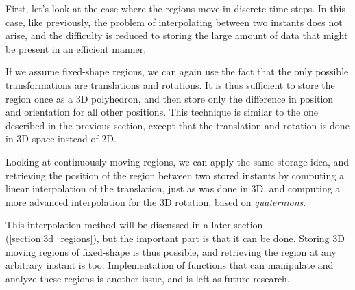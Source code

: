 First, let's look at the case where the regions move in discrete time steps. In this case, like previously, the problem of interpolating between two instants does not arise, and the difficulty is reduced to storing the large amount of data that might be present in an efficient manner. 

If we assume fixed-shape regions, we can again use the fact that the only possible transformations are translations and rotations. It is thus sufficient to store the region once as a 3D polyhedron, and then store only the difference in position and orientation for all other positions. This technique is similar to the one described in the previous section, except that the translation and rotation is done in 3D space instead of 2D.

Looking at continuously moving regions, we can apply the same storage idea, and retrieving the position of the region between two stored instants by computing a linear interpolation of the translation, just as was done in 3D, and computing a more advanced interpolation for the 3D rotation, based on \textit{quaternions}.

This interpolation method will be discussed in a later section (\ref{section:3d_regions}), but the important part is that it can be done. Storing 3D moving regions of fixed-shape is thus possible, and retrieving the region at any arbitrary instant is too. Implementation of functions that can manipulate and analyze these regions is another issue, and is left as future research.
